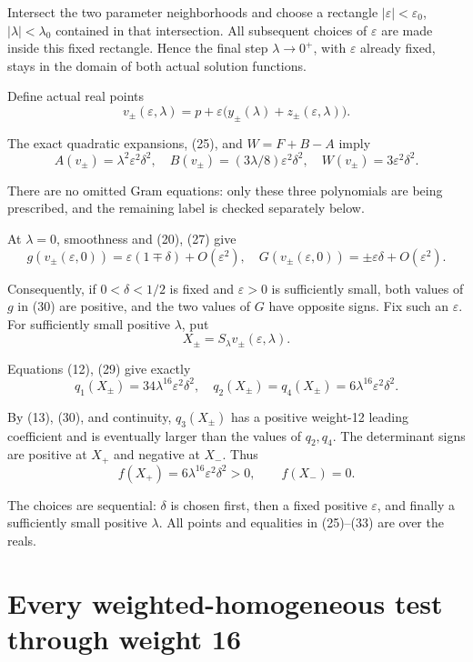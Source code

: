 \documentclass[11pt]{article}
\begin{document}
Intersect the two parameter neighborhoods and choose a rectangle
\(|\varepsilon|<\varepsilon_0\), \(|\lambda|<\lambda_0\) contained
in that intersection. All subsequent choices of \(\varepsilon\) are
made inside this fixed rectangle. Hence the final step
\(\lambda\to0^+\), with \(\varepsilon\) already fixed, stays in
the domain of both actual solution functions.

Define actual real points
\[
v_\pm(\varepsilon,\lambda)
 =p+\varepsilon\bigl(y_\pm(\lambda)+z_\pm(\varepsilon,\lambda)\bigr).
\tag{28}
\]

The exact quadratic expansions, (25), and \(W=F+B-A\) imply
\[
A(v_\pm)=\lambda^2\varepsilon^2\delta^2,
\quad B(v_\pm)=(3\lambda/8)\varepsilon^2\delta^2,
\quad W(v_\pm)=3\varepsilon^2\delta^2.
\tag{29}
\]

There are no omitted Gram equations: only these three polynomials are being
prescribed, and the remaining label is checked separately below.

At \(\lambda=0\), smoothness and (20), (27) give
\[
g(v_\pm(\varepsilon,0))=\varepsilon(1\mp\delta)+O(\varepsilon^2),
\quad G(v_\pm(\varepsilon,0))=\pm\varepsilon\delta+O(\varepsilon^2).
\tag{30}
\]

Consequently, if \(0<\delta<1/2\) is fixed and \(\varepsilon>0\)
is sufficiently small, both values of \(g\) in (30) are positive, and
the two values of \(G\) have opposite signs. Fix such an \(\varepsilon\).
For sufficiently small positive \(\lambda\), put
\[
X_\pm=S_\lambda v_\pm(\varepsilon,\lambda).
\tag{31}
\]

Equations (12), (29) give exactly
\[
q_1(X_\pm)=34\lambda^{16}\varepsilon^2\delta^2,
\quad q_2(X_\pm)=q_4(X_\pm)=6\lambda^{16}\varepsilon^2\delta^2.
\tag{32}
\]

By (13), (30), and continuity, \(q_3(X_\pm)\) has a positive
weight-12 leading coefficient and is eventually larger than the values of
\(q_2,q_4\). The determinant signs are positive at \(X_+\) and
negative at \(X_-\). Thus
\[
f(X_+)=6\lambda^{16}\varepsilon^2\delta^2>0,
\qquad f(X_-)=0.
\tag{33}
\]

The choices are sequential: \(\delta\) is chosen first, then a fixed
positive \(\varepsilon\), and finally a sufficiently small positive
\(\lambda\). All points and equalities in (25)--(33) are over the reals.

\section{Every weighted-homogeneous test through weight 16}
\end{document}
